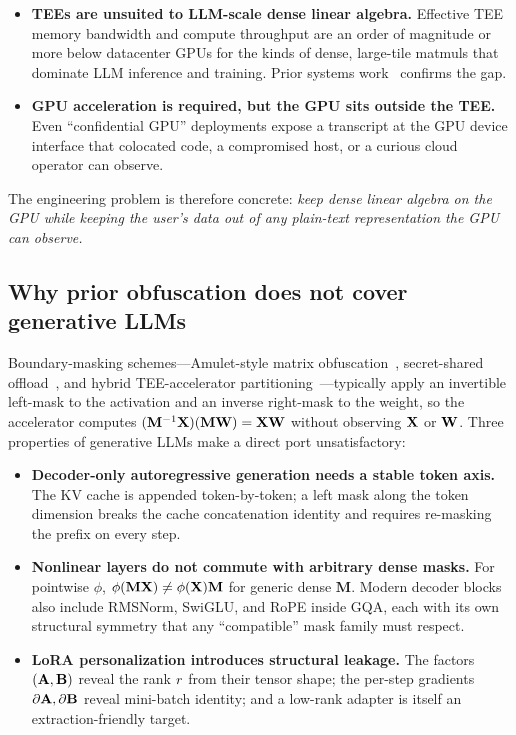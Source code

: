 \begin{itemize}[leftmargin=*, nosep]
  \item \textbf{TEEs are unsuited to LLM-scale dense linear algebra.} Effective TEE memory bandwidth and compute throughput are an order of magnitude or more below datacenter GPUs for the kinds of dense, large-tile matmuls that dominate LLM inference and training. Prior systems work~\cite{tramer2019slalom, volos2018graviton} confirms the gap.
  \item \textbf{GPU acceleration is required, but the GPU sits outside the TEE.} Even ``confidential GPU'' deployments expose a transcript at the GPU device interface that colocated code, a compromised host, or a curious cloud operator can observe.
\end{itemize}

\noindent The engineering problem is therefore concrete: \emph{keep dense linear algebra on the GPU while keeping the user's data out of any plain-text representation the GPU can observe.}

\subsection{Why prior obfuscation does not cover generative LLMs}
Boundary-masking schemes---Amulet-style matrix obfuscation~\cite{amulet2024todo}, secret-shared offload~\cite{mohassel2017secureml, liu2017minionn}, and hybrid TEE-accelerator partitioning~\cite{tramer2019slalom, hunt2018chiron, kunkel2019tensorscone}---typically apply an invertible left-mask to the activation and an inverse right-mask to the weight, so the accelerator computes $(\mathbf{M}^{-1}\mathbf{X})(\mathbf{M}\mathbf{W}) = \mathbf{X}\mathbf{W}$ without observing $\mathbf{X}$ or $\mathbf{W}$. Three properties of generative LLMs make a direct port unsatisfactory:

\begin{itemize}[leftmargin=*, nosep]
  \item \textbf{Decoder-only autoregressive generation needs a stable token axis.} The KV cache is appended token-by-token; a left mask along the token dimension breaks the cache concatenation identity and requires re-masking the prefix on every step.
  \item \textbf{Nonlinear layers do not commute with arbitrary dense masks.} For pointwise $\phi$, $\phi(\mathbf{M}\mathbf{X}) \neq \phi(\mathbf{X})\mathbf{M}$ for generic dense $\mathbf{M}$. Modern decoder blocks also include RMSNorm, SwiGLU, and RoPE inside GQA, each with its own structural symmetry that any ``compatible'' mask family must respect.
  \item \textbf{LoRA personalization introduces structural leakage.} The factors $(\mathbf{A}, \mathbf{B})$ reveal the rank $r$ from their tensor shape; the per-step gradients $\partial \mathbf{A}, \partial \mathbf{B}$ reveal mini-batch identity; and a low-rank adapter is itself an extraction-friendly target.
\end{itemize}


